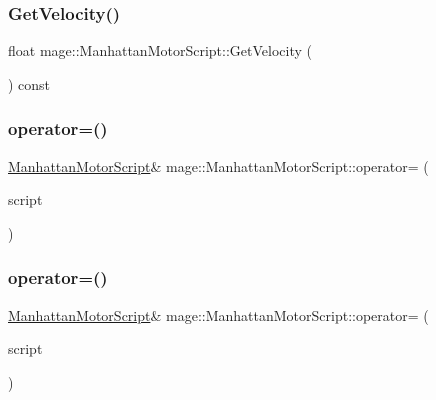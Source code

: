 \subsubsection{\texorpdfstring{Get\+Velocity()}{GetVelocity()}}
{\footnotesize\ttfamily float mage\+::\+Manhattan\+Motor\+Script\+::\+Get\+Velocity (\begin{DoxyParamCaption}{ }\end{DoxyParamCaption}) const}

\hypertarget{classmage_1_1_manhattan_motor_script_a563d4d429bbcabf25f57539857dde53c}{}\label{classmage_1_1_manhattan_motor_script_a563d4d429bbcabf25f57539857dde53c} 
\subsubsection{\texorpdfstring{operator=()}{operator=()}\hspace{0.1cm}{\footnotesize\ttfamily [1/2]}}
{\footnotesize\ttfamily \hyperlink{classmage_1_1_manhattan_motor_script}{Manhattan\+Motor\+Script}\& mage\+::\+Manhattan\+Motor\+Script\+::operator= (\begin{DoxyParamCaption}\item[{const \hyperlink{classmage_1_1_manhattan_motor_script}{Manhattan\+Motor\+Script} \&}]{script }\end{DoxyParamCaption})\hspace{0.3cm}{\ttfamily [delete]}}

\hypertarget{classmage_1_1_manhattan_motor_script_a944149dc06764bc23feffde4de100679}{}\label{classmage_1_1_manhattan_motor_script_a944149dc06764bc23feffde4de100679} 
\subsubsection{\texorpdfstring{operator=()}{operator=()}\hspace{0.1cm}{\footnotesize\ttfamily [2/2]}}
{\footnotesize\ttfamily \hyperlink{classmage_1_1_manhattan_motor_script}{Manhattan\+Motor\+Script}\& mage\+::\+Manhattan\+Motor\+Script\+::operator= (\begin{DoxyParamCaption}\item[{\hyperlink{classmage_1_1_manhattan_motor_script}{Manhattan\+Motor\+Script} \&\&}]{script }\end{DoxyParamCaption})\hspace{0.3cm}{\ttfamily [delete]}}

